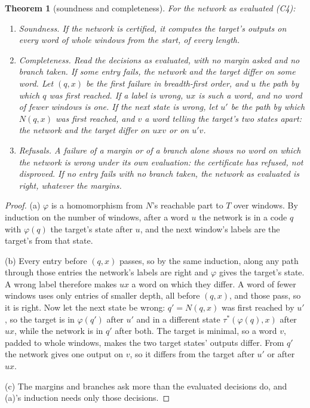 \documentclass[11pt]{article}
\newtheorem{theorem}{Theorem}
\theoremstyle{definition}
\begin{document}
\begin{theorem}[soundness and completeness]
\label{thm:exact}
For the network as evaluated (C4):
\begin{enumerate}
\item[(a)] \emph{Soundness.} If the network is certified, it computes the target's outputs on every
word of whole windows from the start, of every length.
\item[(b)] \emph{Completeness.} Read the decisions as evaluated, with no margin asked and no branch
taken. If some entry fails, the network and the target differ on some word. Let $(q, x)$ be the first
failure in breadth-first order, and $u$ the path by which $q$ was first reached. If a label is wrong,
$ux$ is such a word, and no word of fewer windows is one. If the next state is wrong, let $u'$ be
the path by which $N(q, x)$ was first reached, and $v$ a word telling the target's two states apart:
the network and the target differ on $uxv$ or on $u'v$.
\item[(c)] \emph{Refusals.} A failure of a margin or of a branch alone shows no word on which the
network is wrong under its own evaluation: the certificate has refused, not disproved. If no entry fails
with no branch taken, the network as evaluated is right, whatever the margins.
\end{enumerate}
\end{theorem}

\begin{proof}
(a) $\varphi$ is a homomorphism from $N$'s reachable part to $T$ over windows. By induction on the
number of windows, after a word $u$ the network is in a code $q$ with $\varphi(q)$ the target's state
after $u$, and the next window's labels are the target's from that state.

(b) Every entry before $(q, x)$ passes, so by the same induction, along any path through those
entries the network's labels are right and $\varphi$ gives the target's state. A wrong label therefore
makes $ux$ a word on which they differ. A word of fewer windows uses only entries of smaller depth,
all before $(q, x)$, and those pass, so it is right. Now let the next state be wrong: $q' = N(q, x)$
was first reached by $u'$, so the target is in $\varphi(q')$ after $u'$ and in a different state
$\tau^\ast(\varphi(q), x)$ after $ux$, while the network is in $q'$ after both. The target is minimal,
so a word $v$, padded to whole windows, makes the two target states' outputs differ. From $q'$ the
network gives one output on $v$, so it differs from the target after $u'$ or after $ux$.

(c) The margins and branches ask more than the evaluated decisions do, and (a)'s induction needs only
those decisions.
\end{proof}
\end{document}
